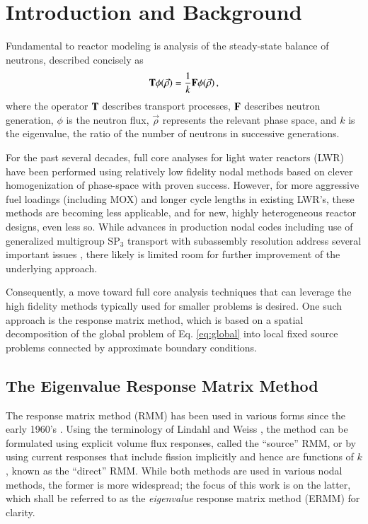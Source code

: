 \section{Introduction and Background}
\label{sec:litreview}

Fundamental to reactor modeling is analysis of the steady-state 
balance of neutrons, described concisely as
\begin{equation}
  \mathbf{T} \phi(\vec{\rho}) = \frac{1}{k} \mathbf{F} \phi(\vec{\rho}) \, ,
  \label{eq:global}
\end{equation}
where the operator $\mathbf{T}$ describes transport processes, $\mathbf{F}$ 
describes neutron generation, $\phi$ is the neutron flux, $\vec{\rho}$ 
represents the relevant phase space, and $k$ is the eigenvalue, the ratio 
of the number of neutrons in successive generations. 

For the past several decades, full core analyses for light water reactors 
(LWR) have been performed using relatively low fidelity nodal methods 
based on clever homogenization of phase-space with proven success.  
However, for more aggressive fuel loadings (including MOX) and longer 
cycle lengths in existing LWR's, these methods are becoming less applicable, 
and for new, highly heterogeneous reactor designs, even less so. While 
advances in production nodal codes including use of generalized multigroup 
SP$_3$ transport with subassembly resolution address several important 
issues \cite{bahadir2009sng}, there likely is limited room for further 
improvement of the underlying approach.

Consequently, a move toward full core analysis techniques that can 
leverage the high fidelity methods typically used for smaller problems 
is desired.  One such approach is the response matrix method, which is 
based on a spatial decomposition of the global problem of Eq. \ref{eq:global}
into local fixed source problems connected by approximate boundary
conditions.

\subsection{The Eigenvalue Response Matrix Method}


The response matrix method (RMM) has been used in various forms since 
the early 1960's \cite{shimizu1963arm}.  Using the terminology of 
Lindahl and Weiss \cite{lindahl1981rrm}, the method can be formulated 
using explicit volume flux responses, called the ``source'' RMM, or by 
using current responses that include fission implicitly and hence are 
functions of $k$, known as the ``direct'' RMM.  While both methods are 
used in various nodal methods, the former is more widespread; the focus 
of this work is on the latter, which shall be referred to as the 
{\it eigenvalue} response matrix method (ERMM) for clarity.

